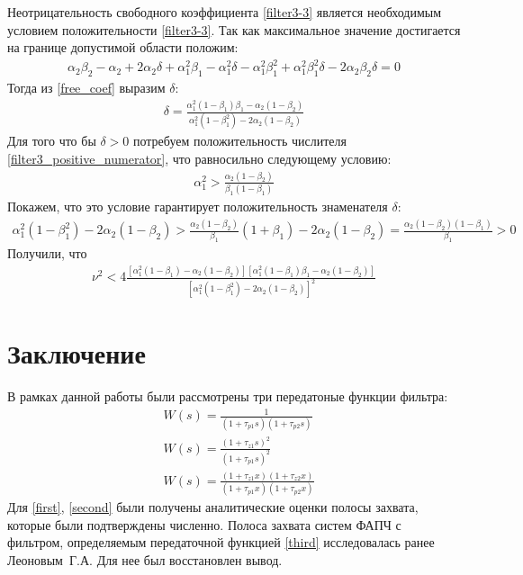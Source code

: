 \documentclass[a4paper,14pt]{article} %
\begin{document}
Неотрицательность свободного коэффициента \eqref{filter3-3} является необходимым условием положительности \eqref{filter3-3}. Так как максимальное значение достигается на границе допустимой области положим:
 \begin{equation}\label{free_coef}
 \begin{aligned}
\alpha_2\beta_2 - \alpha_2 + 2\alpha_2\delta + \alpha_1^2\beta_1 - \alpha_1^2\delta - \alpha_1^2\beta_1^2 + \alpha_1^2\beta_1^2\delta - 2\alpha_2\beta_2\delta = 0
 \end{aligned}
\end{equation}
Тогда из \eqref{free_coef} выразим $\delta$:
 \begin{equation}\label{filter3_positive_numerator}
 \begin{aligned}
\delta = \frac{\alpha_1^2(1-\beta_1)\beta_1 - \alpha_2(1-\beta_2)}{\alpha_1^2(1-\beta_1^2) - 2\alpha_2(1-\beta_2)}
 \end{aligned}
 \end{equation}
Для того что бы $\delta > 0$ потребуем положительность числителя \eqref{filter3_positive_numerator}, что равносильно следующему условию:
 \begin{equation}
 \begin{aligned}
\alpha_1^2 > \frac{\alpha_2(1-\beta_2)}{\beta_1(1-\beta_1)}
 \end{aligned}
 \end{equation}
Покажем, что это условие гарантирует положительность знаменателя $\delta$:
 \begin{equation}
 \begin{aligned}
\alpha_1^2(1-\beta_1^2) - 2\alpha_2(1-\beta_2) > \frac{\alpha_2(1-\beta_2)}{\beta_1}(1+\beta_1) - 2\alpha_2(1-\beta_2)= \frac{\alpha_2(1-\beta_2)(1 - \beta_1)}{\beta_1} > 0
 \end{aligned}
 \end{equation}
Получили, что
 \begin{equation}
 \begin{aligned}
\nu^2 < 4\frac{[\alpha_1^2(1-\beta_1) - \alpha_2(1-\beta_2)][\alpha_1^2(1-\beta_1)\beta_1 - \alpha_2(1-\beta_2)]}{[\alpha_1^2(1-\beta_1^2) - 2\alpha_2(1-\beta_2)]^2}
 \end{aligned}
 \end{equation}
 
\pagebreak
\section{Заключение}
В рамках данной работы были рассмотрены три передатоные функции фильтра: 
 \begin{align}
&W(s) = \frac{1}{(1+\tau_{p1}s)(1+\tau_{p2}s)}\label{first}\\[5pt]
&W(s) = \frac{(1+\tau_{z1}s)^2}{(1+\tau_{p1}s)^2}\label{second}\\[5pt]
&W(s) = \frac{(1+\tau_{z1}x)(1+\tau_{z2}x)}{(1+\tau_{p1}x)(1+\tau_{p2}x)}\label{third}
 \end{align}
 Для \eqref{first}, \eqref{second} были получены аналитические оценки полосы захвата, которые были подтверждены численно. Полоса захвата систем ФАПЧ с фильтром, определяемым передаточной функцией \eqref{third} исследовалась ранее Леоновым~Г.\:А. Для нее был восстановлен вывод. 
 
\end{document}
